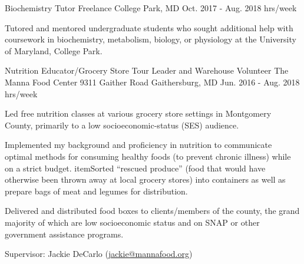\begin{cventries}
  \cventry
    {Biochemistry Tutor} %
    {Freelance} %
    {College Park, MD} %
    {Oct. 2017 - Aug. 2018  hrs/week} %
    {
      \begin{cvitems} %
        \item {Tutored and mentored undergraduate students who sought additional help with coursework in biochemistry, metabolism, biology, or physiology at the University of Maryland, College Park.}
      \end{cvitems}
    }


  \cventry
    {Nutrition Educator/Grocery Store Tour Leader and Warehouse Volunteer } %
    {The Manna Food Center } %
    {9311 Gaither Road \newline
Gaithersburg, MD} %
    {Jun. 2016 - Aug. 2018  hrs/week} %
    {
      \begin{cvitems} %
        \item {Led free nutrition classes at various grocery store settings in Montgomery County, primarily to a low socioeconomic-status (SES) audience.}
        \item {Implemented my background and proficiency in nutrition to communicate optimal methods for consuming healthy foods (to prevent chronic illness) while on a strict budget.}
        item{Sorted “rescued produce” (food that would have otherwise been thrown away at local grocery stores) into containers as well as prepare bags of meat and legumes for distribution.}
        \item{Delivered and distributed food boxes to clients/members of the county, the grand majority of which are low socioeconomic status and on SNAP or other government assistance programs.}
        \item {Supervisor: Jackie DeCarlo (\textcolor{navyblue}{\underline{\href{mailto:jackie@mannafood.org}{jackie@mannafood.org}}})}
      \end{cvitems}
    }




\end{cventries}

